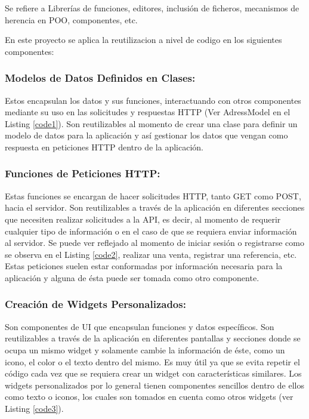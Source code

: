 \documentclass[runningheads]{llncs}
\begin{document}
Se refiere a Librerías de funciones, editores, inclusión de ficheros, mecanismos de herencia en POO, componentes, etc.

En este proyecto se aplica la reutilizacion a nivel de codigo en los siguientes componentes:

\subsubsection*{Modelos de Datos Definidos en Clases:}
Estos encapsulan los datos y sus funciones, interactuando con otros componentes mediante su uso en las solicitudes y respuestas HTTP (Ver AdressModel en el Listing \ref{code1}). Son reutilizables al momento de crear una clase para definir un modelo de datos para la aplicación y así gestionar los datos que vengan como respuesta en peticiones HTTP dentro de la aplicación.


\subsubsection*{Funciones de Peticiones HTTP:}
Estas funciones se encargan de hacer solicitudes HTTP, tanto GET como POST, hacia el servidor. Son reutilizables a través de la aplicación en diferentes secciones que necesiten realizar solicitudes a la API, es decir, al momento de requerir cualquier tipo de información o en el caso de que se requiera enviar información al servidor. Se puede ver reflejado al momento de iniciar sesión o registrarse como se observa en el Listing \ref{code2}, realizar una venta, registrar una referencia, etc. Estas peticiones suelen estar conformadas por información necesaria para la aplicación y alguna de ésta puede ser tomada como otro componente.


\subsubsection*{Creación de Widgets Personalizados:}
Son componentes de UI que encapsulan funciones y datos específicos. Son reutilizables a través de la aplicación en diferentes pantallas y secciones donde se ocupa un mismo widget y solamente cambie la información de éste, como un icono, el color o el texto dentro del mismo. Es muy útil ya que se evita repetir el código cada vez que se requiera crear un widget con características similares. Los widgets personalizados por lo general tienen componentes sencillos dentro de ellos como texto o iconos, los cuales son tomados en cuenta como otros widgets (ver Listing \ref{code3}).

\end{document}
